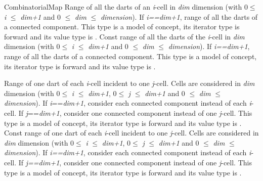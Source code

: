 \begin{ccRefConcept}{CombinatorialMap}
{Range of all the darts of an \emph{i}-cell in \emph{dim} dimension
  (with 0$\leq$ \emph{i} $\leq$ \emph{dim+1} and 0 $\leq$ \emph{dim} $\leq$ \emph{dimension}). If \emph{i==dim+1},  
  range of all the darts of a connected component.
  This type is a model of  concept, its iterator type is forward and its value type is .}
\ccGlue
{}
{Const range of all the darts of the \emph{i}-cell in \emph{dim} dimension 
  (with 0$\leq$ \emph{i} $\leq$ \emph{dim+1} and 0 $\leq$ \emph{dim} $\leq$ \emph{dimension}). If \emph{i==dim+1},  
  range of all the darts of a connected component.
  This type is a model of  concept, its iterator type is forward and its value type is .}

{Range of one dart of each \emph{i}-cell incident to one \emph{j}-cell.
  Cells are considered in \emph{dim} dimension  
  (with 0$\leq$ \emph{i} $\leq$ \emph{dim+1}, 0$\leq$ \emph{j} $\leq$ \emph{dim+1} and
  0 $\leq$ \emph{dim} $\leq$ \emph{dimension}). If \emph{i}==\emph{dim+1},  
  consider each connected component instead of each \emph{i}-cell. If \emph{j}==\emph{dim+1},
  consider one connected component instead of one \emph{j}-cell.	
  This type is a model of  concept, its iterator type is forward and its value type is .}
\ccGlue
{}
{Const range of one dart of each \emph{i}-cell incident to one \emph{j}-cell.
  Cells are considered in \emph{dim} dimension  
  (with 0$\leq$ \emph{i} $\leq$ \emph{dim+1}, 0$\leq$ \emph{j} $\leq$ \emph{dim+1} and
  0 $\leq$ \emph{dim} $\leq$ \emph{dimension}). If \emph{i==dim+1},  
  consider each connected component instead of each \emph{i}-cell. If \emph{j==dim+1},
  consider one connected component instead of one \emph{j}-cell.
  This type is a model of  concept, its iterator type is forward and its value type is .}


\end{ccRefConcept}
